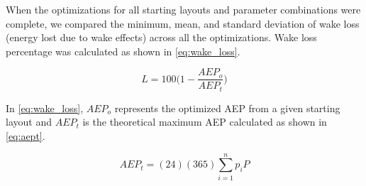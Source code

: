 \documentclass[a4paper]{jpconf}
\begin{document}
When the optimizations for all starting layouts and parameter combinations were complete, we compared the minimum, mean, and standard deviation of wake loss (energy lost due to wake effects) across all the optimizations. Wake loss percentage was calculated as shown in \cref{eq:wake_loss}.

\begin{equation} \label{eq:wake_loss}
	L = 100 \bigg( 1 - \frac{AEP_o}{AEP_t} \bigg)
\end{equation}

 In \cref{eq:wake_loss}, $AEP_o$ represents the optimized AEP from a given starting layout and $AEP_t$ is the theoretical maximum AEP calculated as shown in \cref{eq:aept}. 
 
 \begin{equation} \label{eq:aept}
 	AEP_t = (24)(365)\sum_{i=1}^{n} p_i P  
 \end{equation}
 
\end{document}
